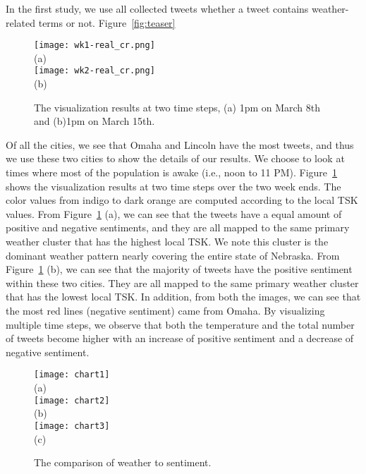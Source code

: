 In the first study, we use all collected tweets whether a tweet contains weather-related terms or not. Figure~\ref{fig:teaser}


\begin{figure}[t]
\begin{center}
\texttt{[image: wk1-real\_cr.png]} \\
\mbox{\small{(a)}}\\
\texttt{[image: wk2-real\_cr.png]} \\
\mbox{\small{(b)}}
\end{center}
\vspace{-.1in}
\caption{The visualization results at two time steps, (a) 1pm on March 8th and (b)1pm on March 15th.}
\label{fig:cities}
\end{figure}

Of all the cities, we see that Omaha and Lincoln have the most tweets, and thus we use these two cities to show the details of our results. We choose to look at times where most of the population is awake (i.e., noon to 11 PM). Figure~\ref{fig:cities} shows the visualization results at two time steps over the two week ends. The color values from indigo to dark orange are computed according to the local TSK values. From Figure~\ref{fig:cities} (a), we can see that the tweets have a equal amount of positive and negative sentiments, and they are all mapped to the same primary weather cluster that has the highest local TSK. We note this cluster is the dominant weather pattern nearly covering the entire state of Nebraska. From Figure~\ref{fig:cities} (b), we can see that the majority of tweets have the positive sentiment within these two cities. They are all mapped to the same primary weather cluster that has the lowest local TSK. In addition, from both the images, we can see that the most red lines (negative sentiment) came from Omaha. By visualizing multiple time steps, we observe that both the temperature and the total number of tweets become higher with an increase of positive sentiment and a decrease of negative sentiment.

\begin{figure}[t]
\begin{center}
\texttt{[image: chart1]} \\
\mbox{\small{(a)}}\\
\texttt{[image: chart2]} \\
\mbox{\small{(b)}}\\
\texttt{[image: chart3]} \\
\mbox{\small{(c)}}
\end{center}
\vspace{-.1in}
\caption{The comparison of weather to sentiment.}
\label{fig:chart_1}
\end{figure}

